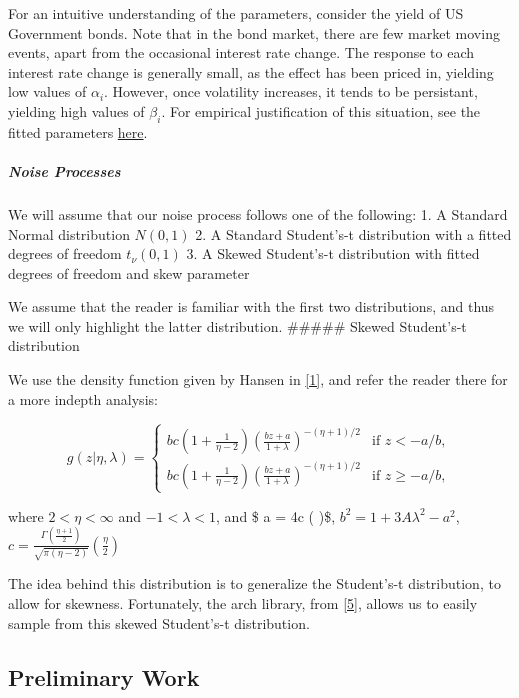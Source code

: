 \documentclass[11pt]{article}
\begin{document}
For an intuitive understanding of the parameters, consider the yield of
US Government bonds. Note that in the bond market, there are few market
moving events, apart from the occasional interest rate change. The
response to each interest rate change is generally small, as the effect
has been priced in, yielding low values of \(\alpha_i\). However, once
volatility increases, it tends to be persistant, yielding high values of
\(\beta_i\). For empirical justification of this situation, see the
fitted parameters \hyperref[fit-garch-models]{here}.

\subparagraph{Noise Processes}\label{noise-processes}

We will assume that our noise process follows one of the following: 1. A
Standard Normal distribution \(N(0,1)\) 2. A Standard Student's-t
distribution with a fitted degrees of freedom \(t_\nu (0,1)\) 3. A
Skewed Student's-t distribution with fitted degrees of freedom and skew
parameter

We assume that the reader is familiar with the first two distributions,
and thus we will only highlight the latter distribution. \#\#\#\#\#
Skewed Student's-t distribution

We use the density function given by Hansen in
\hyperref[references]{[1]}, and refer the reader there for a more
indepth analysis:

\[g(z|\eta, \lambda) =
\begin{cases}
    bc \left(1 + \frac{1}{\eta - 2} \right) \left( \frac{bz + a}{1 + \lambda} \right)^{-(\eta + 1)/2} & \text{if } z < -a/b, \\
    bc \left(1 + \frac{1}{\eta - 2} \right) \left( \frac{bz + a}{1 + \lambda} \right)^{-(\eta + 1)/2} & \text{if } z \geq -a/b,
\end{cases}\]

where \(2 < \eta < \infty\) and \(-1 < \lambda < 1\), and \$ a =
4\lambda c \left(  \right)\$,
\(b^2 = 1 + 3A \lambda^2 - a^2\),
\(c = \frac{\Gamma\left( \frac{\eta + 1}{2} \right)}{\sqrt{\pi (\eta - 2)}} \left( \frac{\eta}{2} \right)\)

The idea behind this distribution is to generalize the Student's-t
distribution, to allow for skewness. Fortunately, the arch library, from
\hyperref[references]{[5]}, allows us to easily sample from this skewed
Student's-t distribution.

    \subsection{Preliminary Work}\label{preliminary-work}
\end{document}
